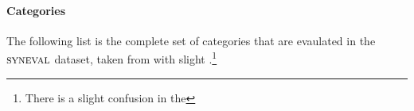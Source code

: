 
\paragraph{Categories} The following list is the complete set of categories that are evaulated in the $\textsc{syneval}$ dataset, taken from \citet{linzen2018targeted} with slight .\footnote{There is a slight confusion in the }

